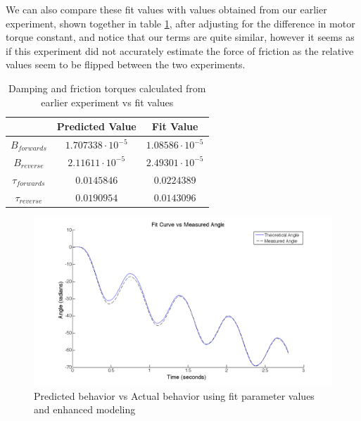 \documentclass{article}
\theoremstyle{plain}
\theoremstyle{definition}
\theoremstyle{remark}
\begin{document}
We can also compare these fit values with values obtained from our earlier experiment, shown together in table \ref{q2_b9}, after adjusting for the difference in motor torque constant, and notice that our terms are quite similar, however it seems as if this experiment did not accurately estimate the force of friction as the relative values seem to be flipped between the two experiments.\\

\begin{table}[htb]
\begin{center}
    \begin{tabular}{|c|c|c|}
        \hline
        ~                 & Predicted Value          & Fit Value               \\ \hline
        $B_{forwards}$    & $1.707338 \cdot 10^{-5}$ & $1.08586 \cdot 10^{-5}$ \\ 
        $B_{reverse}$     & $2.11611 \cdot 10^{-5}$  & $2.49301 \cdot 10^{-5}$ \\ 
        $\tau_{forwards}$ & $0.0145846$              & $0.0224389$             \\ 
        $\tau_{reverse}$  & $0.0190954$              & $0.0143096$             \\
        \hline
    \end{tabular}
\caption{Damping and friction torques calculated from earlier experiment vs fit values}
\label{q2_b9}
\end{center}
\end{table}

\begin{figure}[htb]
\begin{center}
\includegraphics[width = 14cm]{awesomefitFiner.png}
\caption{Predicted behavior vs Actual behavior using fit parameter values and enhanced modeling}
\label{q2_b3}
\end{center}
\end{figure}
\end{document}
